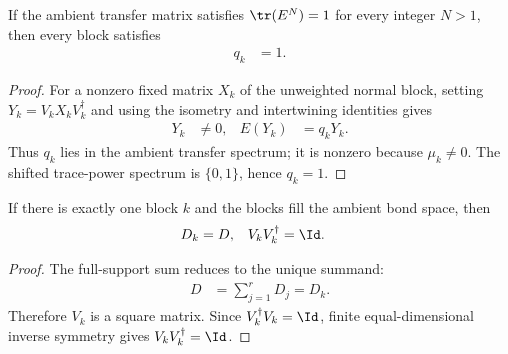 \begin{lemma}
    \label{thm:mpu_transfer_eigenvalue_one}
    \leanok
    If the ambient transfer matrix satisfies $\tr(E^N)=1$ for every integer
    $N>1$, then every block satisfies
    \begin{align}
        q_k & =1.
    \end{align}
\end{lemma}

\begin{proof}\leanok
    For a nonzero fixed matrix $X_k$ of the unweighted normal block, setting
    $Y_k=V_kX_kV_k^\dagger$ and using the isometry and intertwining identities gives
    \begin{align}
        Y_k & \ne0,
            & E(Y_k) & =q_kY_k.
    \end{align}
    Thus $q_k$ lies in the ambient transfer spectrum; it is nonzero because
    $\mu_k\ne0$. The shifted trace-power spectrum is $\{0,1\}$, hence
    $q_k=1$.
\end{proof}

\begin{lemma}
    \label{thm:mpu_unique_full_support_geometry}
    \leanok
    If there is exactly one block $k$ and the blocks fill the
    ambient bond space, then
    \begin{align}
        D_k & =D,
            & V_kV_k^\dagger & =\Id.
    \end{align}
\end{lemma}

\begin{proof}\leanok
    The full-support sum reduces to the unique summand:
    \begin{align}
        D & =\sum_{j=1}^{r}D_j=D_k.
    \end{align}
    Therefore $V_k$ is a square matrix. Since $V_k^\dagger V_k=\Id$, finite
    equal-dimensional inverse symmetry gives $V_kV_k^\dagger=\Id$.
\end{proof}

